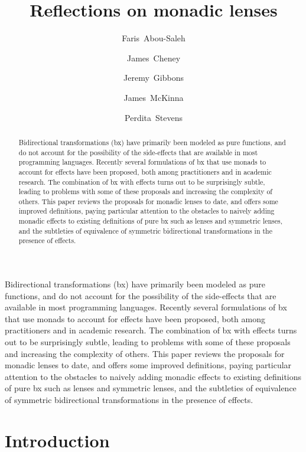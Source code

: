 \documentclass[runningheads]{llncs}
\title{Reflections on monadic lenses}
\author{Faris~Abou-Saleh\oxford \and 
  James~Cheney\edinburgh \and 
  Jeremy~Gibbons\oxford \and 
  James~McKinna\edinburgh \and 
  Perdita~Stevens\edinburgh}
\institute{University of Oxford, \email{firstname.lastname@cs.ox.ac.uk}
\and University of Edinburgh, \email{firstname.lastname@ed.ac.uk}
}
\begin{document}
\maketitle

\begin{abstract}
  Bidirectional transformations (bx) have primarily been modeled as
  pure functions, and do not account for the possibility of the
  side-effects  that are available in most programming languages. Recently
  several formulations of bx that use monads to account for effects
  have been proposed, both among practitioners and in academic
  research. The combination of bx with effects turns out to be
  surprisingly subtle, leading to problems with some of these
  proposals and increasing the complexity of others. This paper
  reviews the proposals for monadic lenses to date,
and offers some improved definitions, paying particular attention to
  the obstacles to naively adding monadic effects to existing
  definitions of pure bx such as lenses and symmetric lenses, and the
  subtleties of equivalence of symmetric bidirectional transformations
  in the presence of effects.
\end{abstract}




Bidirectional transformations (bx) have primarily been modeled as pure
functions, and do not account for the possibility of the side-effects
that are available in most programming languages. Recently several
formulations of bx that use monads to account for effects have been
proposed, both among practitioners and in academic research. The
combination of bx with effects turns out to be surprisingly subtle,
leading to problems with some of these proposals and increasing the
complexity of others. This paper reviews the proposals for monadic
lenses to date, and offers some improved definitions, paying
particular attention to the obstacles to naively adding monadic
effects to existing definitions of pure bx such as lenses and
symmetric lenses, and the subtleties of equivalence of symmetric
bidirectional transformations in the presence of effects.

\fi
\section{Introduction}
\end{document}
